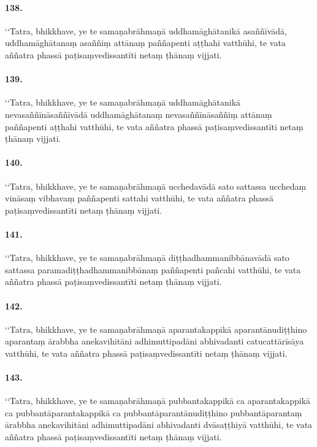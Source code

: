 \paragraph{138.}
‘‘Tatra, bhikkhave, ye te samaṇabrāhmaṇā uddhamāghātanikā asaññīvādā, uddhamāghātanaṃ asaññiṃ attānaṃ paññapenti aṭṭhahi vatthūhi, te vata aññatra phassā paṭisaṃvedissantīti netaṃ ṭhānaṃ vijjati.

\paragraph{139.}
‘‘Tatra, bhikkhave, ye te samaṇabrāhmaṇā uddhamāghātanikā nevasaññīnāsaññīvādā uddhamāghātanaṃ nevasaññīnāsaññiṃ attānaṃ paññapenti aṭṭhahi vatthūhi, te vata aññatra phassā paṭisaṃvedissantīti netaṃ ṭhānaṃ vijjati.

\paragraph{140.}
‘‘Tatra, bhikkhave, ye te samaṇabrāhmaṇā ucchedavādā sato sattassa ucchedaṃ vināsaṃ vibhavaṃ paññapenti sattahi vatthūhi, te vata aññatra phassā paṭisaṃvedissantīti netaṃ ṭhānaṃ vijjati.

\paragraph{141.}
‘‘Tatra, bhikkhave, ye te samaṇabrāhmaṇā diṭṭhadhammanibbānavādā sato sattassa paramadiṭṭhadhammanibbānaṃ paññapenti pañcahi vatthūhi, te vata aññatra phassā paṭisaṃvedissantīti netaṃ ṭhānaṃ vijjati.

\paragraph{142.}
‘‘Tatra, bhikkhave, ye te samaṇabrāhmaṇā aparantakappikā aparantānudiṭṭhino aparantaṃ ārabbha anekavihitāni adhimuttipadāni abhivadanti catucattārīsāya vatthūhi, te vata aññatra phassā paṭisaṃvedissantīti netaṃ ṭhānaṃ vijjati.

\paragraph{143.}
‘‘Tatra, bhikkhave, ye te samaṇabrāhmaṇā pubbantakappikā ca aparantakappikā ca pubbantāparantakappikā ca pubbantāparantānudiṭṭhino pubbantāparantaṃ ārabbha anekavihitāni adhimuttipadāni abhivadanti dvāsaṭṭhiyā vatthūhi, te vata aññatra phassā paṭisaṃvedissantīti netaṃ ṭhānaṃ vijjati.

